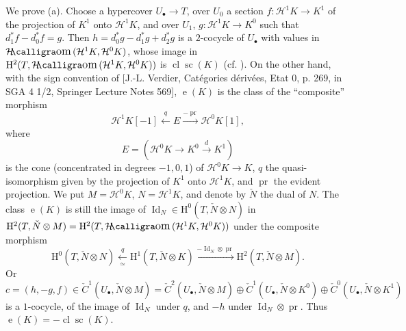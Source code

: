 \documentclass[10pt,reqno]{article}
\renewcommand{\H}{\mathrm{H}}
\newcommand{\HH}{\mathcal{H}}
\newcommand{\ah}{^\ast}
\newcommand{\bl}{_\bullet}
\DeclareMathOperator{\Id}{Id}
\DeclareMathOperator{\pr}{pr}
\DeclareMathOperator{\Sc}{sc}
\DeclareMathOperator{\Cl}{cl}
\DeclareMathOperator{\e}{e}
\DeclareMathOperator{\SHom}{\mathcal{H}\text{\kern -3pt {\calligra\large om}}\,}
\theoremstyle{plain}
\theoremstyle{definition}
\begin{document}
We prove (a). Choose a hypercover $U\bl\to T$, over $U_0$ a section $f:\HH^1 K\to K^1$ of the projection
of $K^1$ onto $\HH^1 K$, and over $U_1$, $g:\HH^1 K\to K^0$ such that $d_1\ah f-d_0\ah f=g$. Then
$h=d_0\ah g-d_1\ah g+d_2\ah g$ is a $2$-cocycle of $U\bl$ with values in $\SHom(\HH^1 K,\HH^0 K)$, whose
image in $\H^2(T,\SHom(\HH^1 K,\HH^0 K))$ is $\Cl\Sc(K)$ (cf. \cite[IV~3.5]{12}). On the other hand,
with the sign convention of
[J.-L. Verdier, Cat{\'e}gories d{\'e}riv{\'e}es, Etat 0, p. 269, in SGA 4 1/2, Springer Lecture Notes 569],
$\e(K)$ is the class of the ``composite'' morphism
\[
  \HH^1 K[-1]\xleftarrow{\ q\ }E\xrightarrow{-\pr}\HH^0 K[1],
\]
where
\[
  E=\left(\HH^0 K\longrightarrow K^0\xrightarrow{\ d\ }K^1\right)
\]
is the cone (concentrated in degrees $-1,0,1$) of $\HH^0 K\to K$, $q$ the quasi-isomorphism given by
the projection of $K^1$ onto $\HH^1 K$, and $\pr$ the evident projection. We put $M=\HH^0 K$,
$N=\HH^1 K$, and denote by $\check{N}$ the dual of $N$. The class $\e(K)$ is still the image of
$\Id_N\in\H^0(T,\check{N}\otimes N)$ in $\H^2(T,\check{N}\otimes M)=\H^2(T,\SHom(\HH^1 K,\HH^0 K))$
under the composite morphism
\[
  \H^0(T,\check{N}\otimes N)\xleftarrow[\ \simeq\ ]{\ q\ }\H^1(T,\check{N}\otimes K)\xrightarrow{-\Id_N\otimes\pr}\H^2(T,\check{N}\otimes M).
\]
Or
\[
  c=(h,-g,f)\in\check{C}^1(U\bl,\check{N}\otimes M)
  =\check{C}^2(U\bl,\check{N}\otimes M)\oplus\check{C}^1(U\bl,\check{N}\otimes K^0)\oplus\check{C}^0(U\bl,\check{N}\otimes K^1)
\]
is a $1$-cocycle, of the image of $\Id_N$ under $q$, and $-h$ under $\Id_N\otimes\pr$. Thus
$\e(K)=-\Cl\Sc(K)$.
\end{document}
